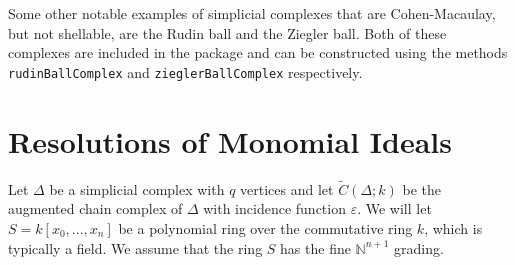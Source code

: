 \documentclass[12pt,leqno]{amsart}
\theoremstyle{definition}
\begin{document}
Some other notable examples of simplicial complexes that are Cohen-Macaulay, but not shellable, are the Rudin ball and the Ziegler ball. Both of these complexes are included in the package and can be constructed using the methods \texttt{rudinBallComplex} and \texttt{zieglerBallComplex} respectively.

\section{Resolutions of Monomial Ideals}
\label{S:Resolutions of Monomial Ideals}
%

%
Let $\Delta$ be a simplicial complex with $q$ vertices and let $\widetilde C(\Delta;k)$ be the augmented chain complex of $\Delta$ with incidence function $\varepsilon$. We will let $S = k[x_0,...,x_n]$ be a polynomial ring over the commutative ring $k$, which is typically a field. We assume that the ring $S$ has the fine $\mathbb N^{n+1}$ grading.
\end{document}
